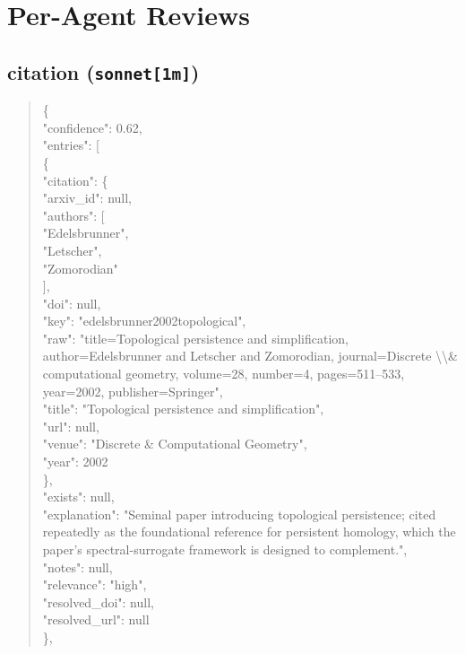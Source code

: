 \documentclass[11pt]{article}
\begin{document}
\section*{Per-Agent Reviews}
\subsection*{citation (\texttt{sonnet[1m]})}
\begin{quote}\small\ttfamily\raggedright
\{\\
  "confidence": 0.62,\\
  "entries": [\\
    \{\\
      "citation": \{\\
        "arxiv\_id": null,\\
        "authors": [\\
          "Edelsbrunner",\\
          "Letscher",\\
          "Zomorodian"\\
        ],\\
        "doi": null,\\
        "key": "edelsbrunner2002topological",\\
        "raw": "title=Topological persistence and simplification, author=Edelsbrunner and Letscher and Zomorodian, journal=Discrete \textbackslash{}\textbackslash{}\& computational geometry, volume=28, number=4, pages=511--533, year=2002, publisher=Springer",\\
        "title": "Topological persistence and simplification",\\
        "url": null,\\
        "venue": "Discrete \& Computational Geometry",\\
        "year": 2002\\
      \},\\
      "exists": null,\\
      "explanation": "Seminal paper introducing topological persistence; cited repeatedly as the foundational reference for persistent homology, which the paper's spectral-surrogate framework is designed to complement.",\\
      "notes": null,\\
      "relevance": "high",\\
      "resolved\_doi": null,\\
      "resolved\_url": null\\
    \},\\

\end{quote}
\end{document}
